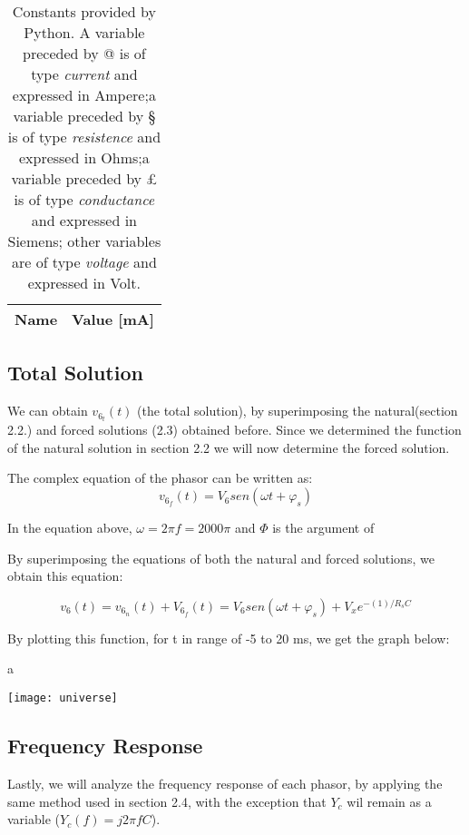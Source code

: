 \begin{table}[!h]
	\centering
	\begin{tabular}{|l|r|}
		\hline    
		{\bf Name} & {\bf Value [mA]} \\ \hline
		
	\end{tabular}
	\caption{Constants provided by Python. A variable preceded by @ is of type {\em current}
		and expressed in Ampere;a variable preceded by § is of type {\it resistence} and expressed in
		Ohms;a variable preceded by £ is of type {\it conductance} and expressed in
		Siemens; other variables are of type {\it voltage} and expressed in
		Volt.}
	\label{tab:op}
\end{table}

\subsection{Total Solution}
We can obtain $v_6_t(t)$ (the total solution), by superimposing the natural(section 2.2.) and forced solutions (2.3) obtained before. Since we determined the function of the natural solution in section 2.2 we will now determine the forced solution.

The complex equation of the phasor can be written as:
\begin{equation}
	v_6_f(t) = V_6sen(\omega t + \varphi_s)
\end{equation}

In the equation above, $\omega = 2\pi f = 2000\pi$ and $\varPhi$ is the argument of 

By superimposing the equations of both the natural and forced solutions, we obtain this equation:

\begin{equation}
	v_6(t) = v_6_n(t) + V_6_f(t) = V_6sen(\omega t + \varphi_s) + V_xe^{-(1)/R_sC}
\end{equation}

By plotting this function, for t in range of -5 to 20 ms, we get the graph below:

\usepackage{graphicx}
\graphicspath{ {./images/} }

a

\texttt{[image: universe]}

\subsection{Frequency Response}

Lastly, we will analyze the frequency response of each phasor, by applying the same method used in section 2.4, with the exception that $Y_c$ wil remain as a variable ($Y_c(f) = j2\pi fC$).

